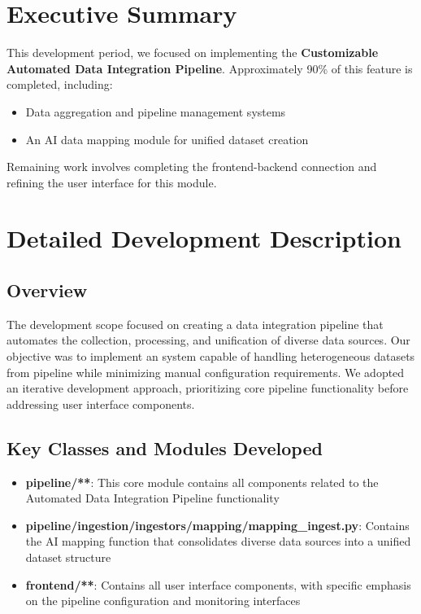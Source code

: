 \section{Executive Summary}

This development period, we focused on implementing the \textbf{Customizable Automated Data Integration Pipeline}.
Approximately 90\% of this feature is completed, including:
\begin{itemize}
    \item Data aggregation and pipeline management systems
    \item An AI data mapping module for unified dataset creation
\end{itemize}

Remaining work involves completing the frontend-backend connection and refining the user interface for this module.

\section{Detailed Development Description}

\subsection{Overview}
The development scope focused on creating a data integration pipeline that automates the collection, processing, and unification of diverse data sources. Our objective was to implement an system capable of handling heterogeneous datasets from pipeline while minimizing manual configuration requirements. We adopted an iterative development approach, prioritizing core pipeline functionality before addressing user interface components.

\subsection{Key Classes and Modules Developed}

\begin{itemize}
    \item \textbf{pipeline/**}: This core module contains all components related to the Automated Data Integration Pipeline functionality
    \item \textbf{pipeline/ingestion/ingestors/mapping/mapping\_ingest.py}: Contains the AI mapping function that consolidates diverse data sources into a unified dataset structure
    \item \textbf{frontend/**}: Contains all user interface components, with specific emphasis on the pipeline configuration and monitoring interfaces
\end{itemize}

